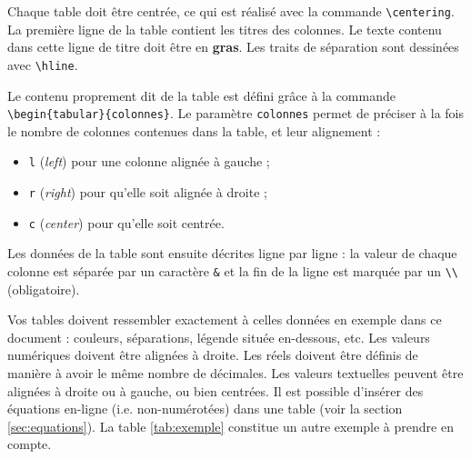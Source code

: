 \documentclass{ASD}
\begin{document}
Chaque table doit être centrée, ce qui est réalisé avec la commande \texttt{\textbackslash{}centering}. La première ligne de la table contient les titres des colonnes. Le texte contenu dans cette ligne de titre doit être en \textbf{gras}. Les traits de séparation sont dessinées avec \texttt{\textbackslash{}hline}.
	
Le contenu proprement dit de la table est défini grâce à la commande \texttt{\textbackslash{}begin\{tabular\}\{colonnes\}}. Le paramètre \texttt{colonnes} permet de préciser à la fois le nombre de colonnes contenues dans la table, et leur alignement : 
\begin{itemize}
	\item \texttt{l} (\textit{left}) pour une colonne alignée à gauche ;
	\item \texttt{r} (\textit{right}) pour qu'elle soit alignée à droite ;
	\item \texttt{c} (\textit{center}) pour qu'elle soit centrée.
\end{itemize}

Les données de la table sont ensuite décrites ligne par ligne : la valeur de chaque colonne est séparée par un caractère \texttt{\&} et la fin de la ligne est marquée par un \texttt{\textbackslash{}\textbackslash{}} (obligatoire).
	
Vos tables doivent ressembler exactement à celles données en exemple dans ce document : couleurs, séparations, légende située en-dessous, etc. Les valeurs numériques doivent être alignées à droite. Les réels doivent être définis de manière à avoir le même nombre de décimales. Les valeurs textuelles peuvent être alignées à droite ou à gauche, ou bien centrées. Il est possible d'insérer des équations en-ligne (i\@.e\@. non-numérotées) dans une table (voir la section \ref{sec:equations}). La table \ref{tab:exemple} constitue un autre exemple à prendre en compte.
	
\end{document}
